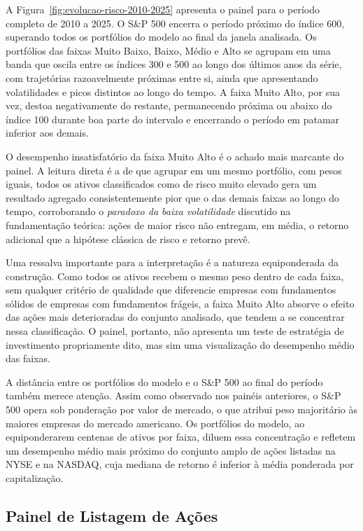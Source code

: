 A Figura~\ref{fig:evolucao-risco-2010-2025} apresenta o painel para o período completo de 2010 a 2025. O S\&P 500 encerra o período próximo do índice 600, superando todos os portfólios do modelo ao final da janela analisada. Os portfólios das faixas Muito Baixo, Baixo, Médio e Alto se agrupam em uma banda que oscila entre os índices 300 e 500 ao longo dos últimos anos da série, com trajetórias razoavelmente próximas entre si, ainda que apresentando volatilidades e picos distintos ao longo do tempo. A faixa Muito Alto, por sua vez, destoa negativamente do restante, permanecendo próxima ou abaixo do índice 100 durante boa parte do intervalo e encerrando o período em patamar inferior aos demais.

O desempenho insatisfatório da faixa Muito Alto é o achado mais marcante do painel. A leitura direta é a de que agrupar em um mesmo portfólio, com pesos iguais, todos os ativos classificados como de risco muito elevado gera um resultado agregado consistentemente pior que o das demais faixas ao longo do tempo, corroborando o \textit{paradoxo da baixa volatilidade} discutido na fundamentação teórica: ações de maior risco não entregam, em média, o retorno adicional que a hipótese clássica de risco e retorno prevê.

Uma ressalva importante para a interpretação é a natureza equiponderada da construção. Como todos os ativos recebem o mesmo peso dentro de cada faixa, sem qualquer critério de qualidade que diferencie empresas com fundamentos sólidos de empresas com fundamentos frágeis, a faixa Muito Alto absorve o efeito das ações mais deterioradas do conjunto analisado, que tendem a se concentrar nessa classificação. O painel, portanto, não apresenta um teste de estratégia de investimento propriamente dito, mas sim uma visualização do desempenho médio das faixas.

A distância entre os portfólios do modelo e o S\&P 500 ao final do período também merece atenção. Assim como observado nos painéis anteriores, o S\&P 500 opera sob ponderação por valor de mercado, o que atribui peso majoritário às maiores empresas do mercado americano. Os portfólios do modelo, ao equiponderarem centenas de ativos por faixa, diluem essa concentração e refletem um desempenho médio mais próximo do conjunto amplo de ações listadas na NYSE e na NASDAQ, cuja mediana de retorno é inferior à média ponderada por capitalização.

\subsection{Painel de Listagem de Ações}
\label{subsec:painel-listagem}

